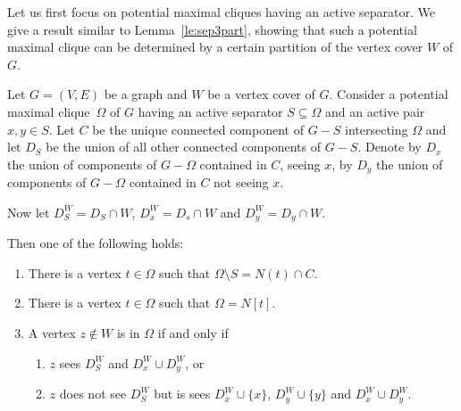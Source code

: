 \documentclass{llncs}
\newcommand{\pmc}{potential maximal clique}
\begin{document}
Let us first focus on potential maximal cliques having an active separator. 
We give a result similar to Lemma~\ref{le:sep3part}, showing that such a potential maximal clique can be determined by a certain partition of the vertex cover $W$ of $G$.
 
 \begin{lemma}\label{le:pmc4part}
Let $G =(V,E)$ be a graph and $W$ be a vertex cover of $G$. Consider a \pmc\ $\Omega$ of $G$ having an active separator $S \subseteq \Omega$ and an active pair $x,y \in S$.
Let $C$ be the unique connected component of $G - S$ intersecting $\Omega$ and let $D_S$ be the union of all other connected components of $G - S$. 
Denote by $D_x$  the union of components of $G - \Omega$ contained in $C$, seeing $x$, by $D_y$ the union of components of $G - \Omega$ contained in $C$ not seeing $x$. 



Now let $D_S^W = D_S \cap W$, $D_x^W = D_s \cap W$ and $D_y^W = D_y \cap W$.  

Then one of the following holds:
\begin{enumerate}
\item\label{it:1} There is a vertex $t \in \Omega$ such that $\Omega \setminus S = N(t) \cap C$.
\item There is a vertex $t \in \Omega$ such that $\Omega = N[t]$.
\item A vertex $z \not\in W$ is in $\Omega$ if and only if
\begin{enumerate}
\item\label{it:SW} $z$ sees $D_S^W$ and $D_x^W \cup D_y^W$, or
\item\label{it:TW} $z$ does not see $D_S^W$ but is sees  $D_x^W \cup \{x\}$, $D_y^W \cup \{y\}$ and $D_x^W \cup D_y^W$.
\end{enumerate}
\end{enumerate}
\end{lemma} 
\end{document}
